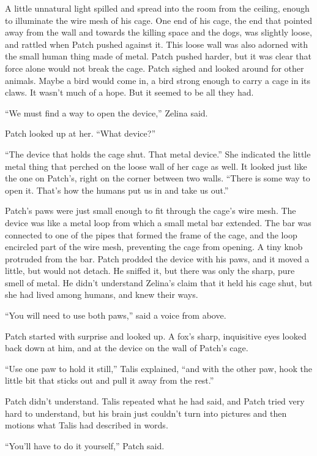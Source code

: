 \documentclass[ebook,oneside,openany,12pt]{memoir}
\begin{document}
A little unnatural light spilled and spread into the room from the
ceiling, enough to illuminate the wire mesh of his cage. One end of
his cage, the end that pointed away from the wall and towards the
killing space and the dogs, was slightly loose, and rattled when Patch
pushed against it. This loose wall was also adorned with the small
human thing made of metal. Patch pushed harder, but it was clear that
force alone would not break the cage. Patch sighed and looked around
for other animals. Maybe a bird would come in, a bird strong enough to
carry a cage in its claws. It wasn’t much of a hope. But it seemed to
be all they had.

“We must find a way to open the device,” Zelina said.

Patch looked up at her. “What device?”

“The device that holds the cage shut. That metal device.” She
indicated the little metal thing that perched on the loose wall of her
cage as well. It looked just like the one on Patch’s, right on the
corner between two walls. “There is some way to open it. That’s how
the humans put us in and take us out.”

Patch’s paws were just small enough to fit through the cage’s wire
mesh. The device was like a metal loop from which a small metal bar
extended. The bar was connected to one of the pipes that formed the
frame of the cage, and the loop encircled part of the wire mesh,
preventing the cage from opening. A tiny knob protruded from the
bar. Patch prodded the device with his paws, and it moved a little,
but would not detach. He sniffed it, but there was only the sharp,
pure smell of metal. He didn’t understand Zelina’s claim that it held
his cage shut, but she had lived among humans, and knew their ways.

“You will need to use both paws,” said a voice from above.

Patch started with surprise and looked up. A fox’s sharp, inquisitive
eyes looked back down at him, and at the device on the wall of Patch’s
cage.

“Use one paw to hold it still,” Talis explained, “and with the other
paw, hook the little bit that sticks out and pull it away from the
rest.”

Patch didn’t understand. Talis repeated what he had said, and Patch
tried very hard to understand, but his brain just couldn’t turn into
pictures and then motions what Talis had described in words.

“You’ll have to do it yourself,” Patch said.
\end{document}
